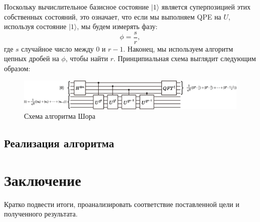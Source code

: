 \documentclass[14pt]{article}
\begin{document}
	Поскольку вычислительное базисное состояние $|1 \rangle$ является суперпозицией этих собственных состояний, это означает, что если мы выполняем QPE на $U$, используя состояние $|1\rangle$, мы будем измерять фазу:
	\begin{equation}
		 \phi = \frac{s}{r},
	\end{equation}
	где $s$ случайное число между 0 и $r - 1$. Наконец, мы используем алгоритм цепных дробей на $\phi$, чтобы найти $r$. Принципиальная схема выглядит следующим образом:
	\begin{figure}[h!]
		\centering
		\includegraphics[scale=0.5]{shor_circuit_1}
		\caption{Схема алгоритма Шора}
	\end{figure}

	
	\newpage
	\subsection{Реализация алгоритма}
		
	
	\newpage
	\section{Заключение}
	Кратко подвести итоги, проанализировать соответствие поставленной цели и полученного результата.
	
	\newpage
	
	
	
\end{document}

